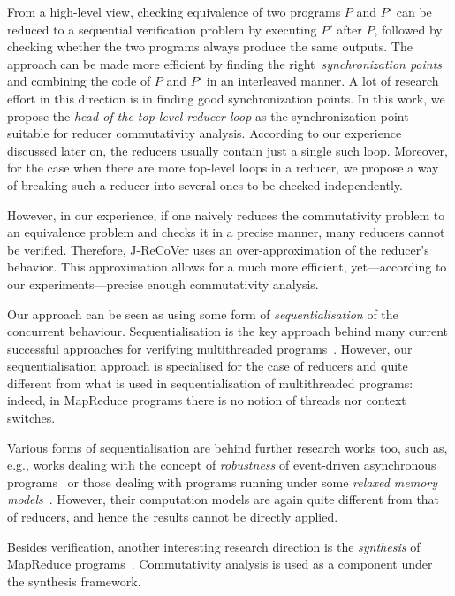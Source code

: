 \documentclass{llncs}
\begin{document}
From a high-level view, checking equivalence of two programs $P$ and $P'$ can be
reduced to a sequential verification problem by executing $P'$ after $P$,
followed by checking whether the two programs always produce the same outputs.
The approach can be made more efficient by finding the
right~\emph{synchronization points} and combining the code of $P$ and $P'$ in an
interleaved manner. A lot of research effort in this direction is in finding
good synchronization points. In this work, we propose the \emph{head of the
top-level reducer loop} as the synchronization point suitable for reducer
commutativity analysis. According to our experience discussed later on, the
reducers usually contain just a single such loop. Moreover, for the case when
there are more top-level loops in a reducer, we propose a way of breaking such a
reducer into several ones to be checked independently.

However, in our experience, if one naively reduces the commutativity problem to
an equivalence problem and checks it in a precise manner, many reducers cannot
be verified. Therefore, J-ReCoVer uses an over-approximation of the reducer's
behavior. This approximation allows for a much more efficient, yet---according
to our experiments---precise enough commutativity analysis.

Our approach can be seen as using some form of \emph{sequentialisation} of the
concurrent behaviour. Sequentialisation is the key approach behind many current
successful approaches for verifying multithreaded
programs~\cite{LalReps:Seq:08,LazyCSeq14}. However, our sequentialisation
approach is specialised for the case of reducers and quite different from what
is used in sequentialisation of multithreaded programs: indeed, in MapReduce
programs there is no notion of threads nor context switches.

Various forms of sequentialisation are behind further research works too, such
as, e.g., works dealing with the concept of \emph{robustness} of event-driven
asynchronous programs~\cite{ahmed2017:robustness} or those dealing with programs
running under some \emph{relaxed memory
models}~\cite{ahmed2013:robustness,AbdullaACLR13,AbdullaACLR12}. However, their
computation models are again quite different from that of reducers, and hence
the results cannot be directly applied.

Besides verification, another interesting research direction is the
\emph{synthesis} of MapReduce programs~\cite{SmithA16}. Commutativity analysis
is used as a component under the synthesis framework.
\end{document}
